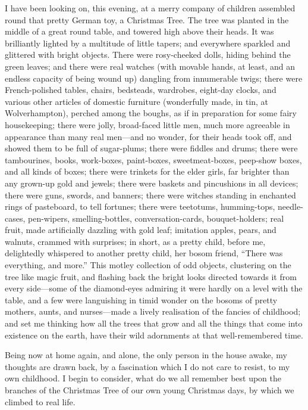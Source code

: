 I have been looking on, this evening, at a merry company of children
assembled round that pretty German toy, a Christmas Tree.  The tree
was planted in the middle of a great round table, and towered high
above their heads.  It was brilliantly lighted by a multitude of
little tapers; and everywhere sparkled and glittered with bright
objects.  There were rosy-cheeked dolls, hiding behind the green
leaves; and there were real watches (with movable hands, at least,
and an endless capacity of being wound up) dangling from innumerable
twigs; there were French-polished tables, chairs, bedsteads,
wardrobes, eight-day clocks, and various other articles of domestic
furniture (wonderfully made, in tin, at Wolverhampton), perched
among the boughs, as if in preparation for some fairy housekeeping;
there were jolly, broad-faced little men, much more agreeable in
appearance than many real men---and no wonder, for their heads took
off, and showed them to be full of sugar-plums; there were fiddles
and drums; there were tambourines, books, work-boxes, paint-boxes,
sweetmeat-boxes, peep-show boxes, and all kinds of boxes; there were
trinkets for the elder girls, far brighter than any grown-up gold
and jewels; there were baskets and pincushions in all devices; there
were guns, swords, and banners; there were witches standing in
enchanted rings of pasteboard, to tell fortunes; there were
teetotums, humming-tops, needle-cases, pen-wipers, smelling-bottles,
conversation-cards, bouquet-holders; real fruit, made artificially
dazzling with gold leaf; imitation apples, pears, and walnuts,
crammed with surprises; in short, as a pretty child, before me,
delightedly whispered to another pretty child, her bosom friend,
``There was everything, and more.''  This motley collection of odd
objects, clustering on the tree like magic fruit, and flashing back
the bright looks directed towards it from every side---some of the
diamond-eyes admiring it were hardly on a level with the table, and
a few were languishing in timid wonder on the bosoms of pretty
mothers, aunts, and nurses---made a lively realisation of the fancies
of childhood; and set me thinking how all the trees that grow and
all the things that come into existence on the earth, have their
wild adornments at that well-remembered time.

Being now at home again, and alone, the only person in the house
awake, my thoughts are drawn back, by a fascination which I do not
care to resist, to my own childhood.  I begin to consider, what do
we all remember best upon the branches of the Christmas Tree of our
own young Christmas days, by which we climbed to real life.

